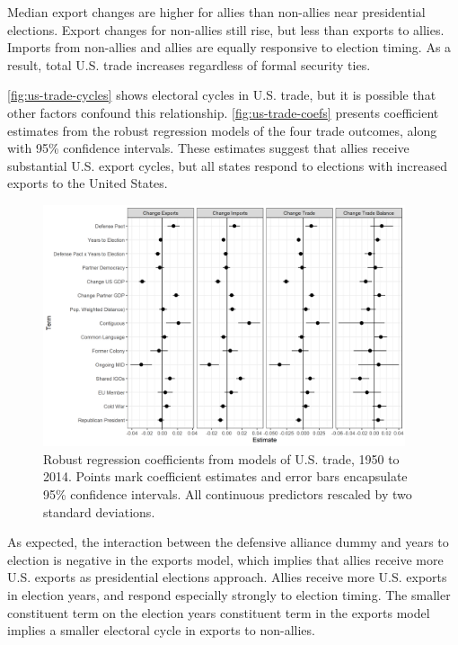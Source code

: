 \documentclass[12pt]{article}
\begin{document}
Median export changes are higher for allies than non-allies near presidential elections. 
Export changes for non-allies still rise, but less than exports to allies. 
Imports from non-allies and allies are equally responsive to election timing. 
As a result, total U.S. trade increases regardless of formal security ties.


\autoref{fig:us-trade-cycles} shows electoral cycles in U.S. trade, but it is possible that other factors confound this relationship.
\autoref{fig:us-trade-coefs} presents coefficient estimates from the robust regression models of the four trade outcomes, along with 95\% confidence intervals. 
These estimates suggest that allies receive substantial U.S. export cycles, but all states respond to elections with increased exports to the United States. 


\begin{figure}
\centering
\includegraphics[width=0.95\textwidth]{../figures/us-trade-coefs.png}
\caption{Robust regression coefficients from models of U.S. trade, 1950 to 2014. Points mark coefficient estimates and error bars encapsulate 95\% confidence intervals. All continuous predictors rescaled by two standard deviations.}
\label{fig:us-trade-coefs}
\end{figure}


As expected, the interaction between the defensive alliance dummy and years to election is negative in the exports model, which implies that allies receive more U.S. exports as presidential elections approach.
Allies receive more U.S. exports in election years, and respond especially strongly to election timing.
The smaller constituent term on the election years constituent term in the exports model implies a smaller electoral cycle in exports to non-allies.
\end{document}
